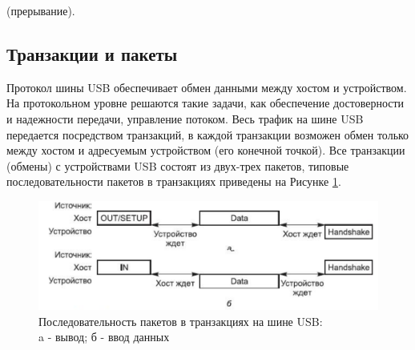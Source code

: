 (прерывание).

%

\subsection{Транзакции и пакеты}
Протокол шины USB обеспечивает обмен данными между хостом и устройством. На протокольном уровне решаются такие задачи, как обеспечение достоверности и надежности передачи, управление потоком. Весь трафик на шине USB передается посредством транзакций, в каждой транзакции возможен обмен только между хостом и адресуемым устройством (его конечной точкой). Все транзакции (обмены) с устройствами USB состоят из двух-трех пакетов, типовые последовательности пакетов в транзакциях приведены на Рисунке \ref{packets}.\par

\begin{figure}[h!]
	\centering
	\includegraphics[scale=0.9]{img/packets.pdf}
	\caption{Последовательность пакетов в транзакциях на шине USB:\\
	a - вывод; б - ввод данных}
	\label{packets}
\end{figure}\par


